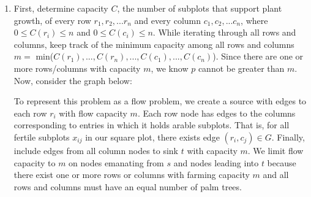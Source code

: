 \documentclass[11pt]{article}
\begin{document}
\begin{enumerate}
\newpage
\item First, determine capacity $C$, the number of subplots that support plant growth, of every row $r_1,r_2,...r_n$ and every column $c_1,c_2,...c_n$, where $0 \leq C(r_i) \leq n$ and $0 \leq C(c_i) \leq n$. While iterating through all rows and columns, keep track of the minimum capacity among all rows and columns \\ $m =$ min($C(r_1),...,C(r_n),...,C(c_1),...,C(c_n)$). Since there are one or more rows/columns with capacity $m$, we know $p$ cannot be greater than $m$. Now, consider the graph below:


To represent this problem as a flow problem, we create a source with edges to each row $r_i$ with flow capacity $m$. Each row node has edges to the columns corresponding to entries in which it holds arable subplots. That is, for all fertile subplots $x_{ij}$ in our square plot, there exists edge $(r_i,c_j) \in G$. Finally, include edges from all column nodes to sink $t$ with capacity $m$. We limit flow capacity to $m$ on nodes emanating from $s$ and nodes leading into $t$ because there exist one or more rows or columns with farming capacity $m$ and all rows and columns must have an equal number of palm trees.\\


\end{enumerate}
\end{document}
